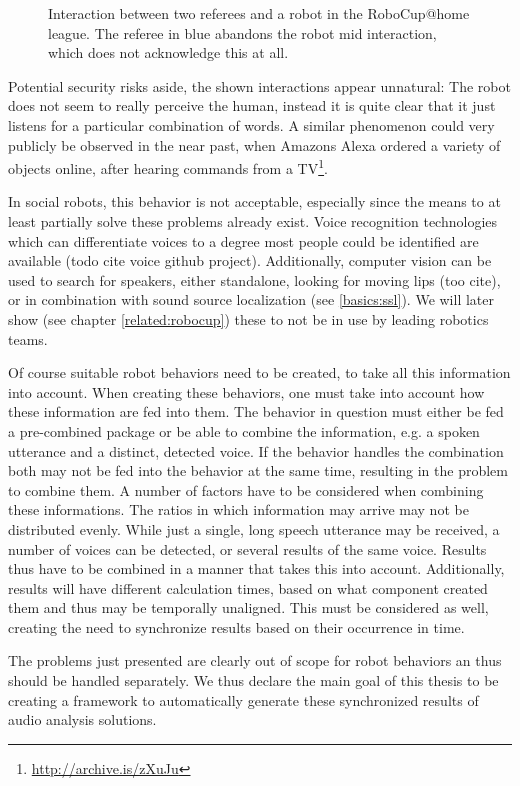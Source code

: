 \begin{figure}[]
	\caption{Interaction between two referees and a robot in the RoboCup@home league.
		The referee in blue abandons the robot mid interaction, which does not acknowledge this at all.}
	\label{pic:moti:imustgonow}
\end{figure}

Potential security risks aside, the shown interactions appear unnatural:
The robot does not seem to really perceive the human, instead it is quite clear that it just listens for a particular combination of words.
A similar phenomenon could very publicly be observed in the near past, when Amazons Alexa ordered a variety of objects online, after hearing commands from a  TV\footnote{\url{http://archive.is/zXuJu}}.

In social robots, this behavior is not acceptable, especially since the means to at least partially solve these problems already exist.
Voice recognition technologies which can differentiate voices to a degree most people could be identified are available (todo cite voice github project).
Additionally, computer vision can be used to search for speakers, either standalone, looking for moving lips (too cite), or in combination with sound source localization (see \ref{basics:ssl}).
We will later show (see chapter \ref{related:robocup}) these to not be in use by leading robotics teams.

Of course suitable robot behaviors need to be created, to take all this information into account.
When creating these behaviors, one must take into account how these information are fed into them.
The behavior in question must either be fed a pre-combined package or be able to combine the information, e.g. a spoken utterance and a distinct, detected voice.
If the behavior handles the combination both may not be fed into the behavior at the same time, resulting in the problem to combine them.
A number of factors have to be considered when combining these informations.
The ratios in which information may arrive may not be distributed evenly.
While just a single, long speech utterance may be received, a number of voices can be detected, or several results of the same voice.
Results thus have to be combined in a manner that takes this into account.
Additionally, results will have different calculation times, based on what component created them and thus may be temporally unaligned.
This must be considered as well, creating the need to synchronize results based on their occurrence in time.

The problems just presented are clearly out of scope for robot behaviors an thus should be handled separately.
We thus declare the main goal of this thesis to be creating a framework to automatically generate these synchronized results of audio analysis solutions.

